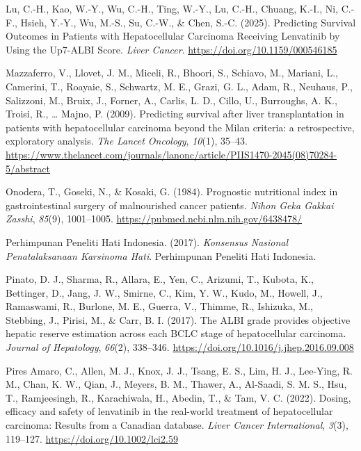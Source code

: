 \documentclass[
  indonesian,
]{report}
\newlength{\cslhangindent}
\newenvironment{CSLReferences}[2] %
 {\begin{list}{}{%
  \setlength{\itemindent}{0pt}
  \setlength{\leftmargin}{0pt}
  \setlength{\parsep}{0pt}
  \ifodd #1
   \setlength{\leftmargin}{\cslhangindent}
   \setlength{\itemindent}{-1\cslhangindent}
  \fi
  \setlength{\itemsep}{#2\baselineskip}}}
 {\end{list}}
\begin{document}
\begin{CSLReferences}{1}{0}
Lu, C.-H., Kao, W.-Y., Wu, C.-H., Ting, W.-Y., Lu, C.-H., Chuang, K.-I.,
Ni, C.-F., Hsieh, Y.-Y., Wu, M.-S., Su, C.-W., \& Chen, S.-C. (2025).
Predicting {Survival} {Outcomes} in {Patients} with {Hepatocellular}
{Carcinoma} {Receiving} {Lenvatinib} by {Using} the {Up7}-{ALBI}
{Score}. \emph{Liver Cancer}. \url{https://doi.org/10.1159/000546185}

Mazzaferro, V., Llovet, J. M., Miceli, R., Bhoori, S., Schiavo, M.,
Mariani, L., Camerini, T., Roayaie, S., Schwartz, M. E., Grazi, G. L.,
Adam, R., Neuhaus, P., Salizzoni, M., Bruix, J., Forner, A., Carlis, L.
D., Cillo, U., Burroughs, A. K., Troisi, R., \ldots{} Majno, P. (2009).
Predicting survival after liver transplantation in patients with
hepatocellular carcinoma beyond the {Milan} criteria: a retrospective,
exploratory analysis. \emph{The Lancet Oncology}, \emph{10}(1), 35--43.
\url{https://www.thelancet.com/journals/lanonc/article/PIIS1470-2045(08)70284-5/abstract}

Onodera, T., Goseki, N., \& Kosaki, G. (1984). Prognostic nutritional
index in gastrointestinal surgery of malnourished cancer patients.
\emph{Nihon Geka Gakkai Zasshi}, \emph{85}(9), 1001--1005.
\url{https://pubmed.ncbi.nlm.nih.gov/6438478/}

Perhimpunan Peneliti Hati Indonesia. (2017). \emph{Konsensus {Nasional}
{Penatalaksanaan} {Karsinoma} {Hati}}. Perhimpunan Peneliti Hati
Indonesia.

Pinato, D. J., Sharma, R., Allara, E., Yen, C., Arizumi, T., Kubota, K.,
Bettinger, D., Jang, J. W., Smirne, C., Kim, Y. W., Kudo, M., Howell,
J., Ramaswami, R., Burlone, M. E., Guerra, V., Thimme, R., Ishizuka, M.,
Stebbing, J., Pirisi, M., \& Carr, B. I. (2017). The {ALBI} grade
provides objective hepatic reserve estimation across each {BCLC} stage
of hepatocellular carcinoma. \emph{Journal of Hepatology}, \emph{66}(2),
338--346. \url{https://doi.org/10.1016/j.jhep.2016.09.008}

Pires Amaro, C., Allen, M. J., Knox, J. J., Tsang, E. S., Lim, H. J.,
Lee-Ying, R. M., Chan, K. W., Qian, J., Meyers, B. M., Thawer, A.,
Al-Saadi, S. M. S., Hsu, T., Ramjeesingh, R., Karachiwala, H., Abedin,
T., \& Tam, V. C. (2022). Dosing, efficacy and safety of lenvatinib in
the real-world treatment of hepatocellular carcinoma: {Results} from a
{Canadian} database. \emph{Liver Cancer International}, \emph{3}(3),
119--127. \url{https://doi.org/10.1002/lci2.59}


\end{CSLReferences}
\end{document}
